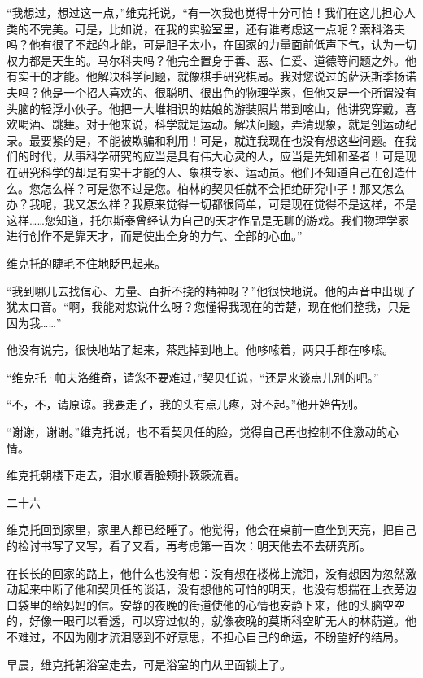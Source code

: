“我想过，想过这一点，”维克托说，“有一次我也觉得十分可怕！我们在这儿担心人类的不完美。可是，比如说，在我的实验室里，还有谁考虑这一点呢？索科洛夫吗？他有很了不起的才能，可是胆子太小，在国家的力量面前低声下气，认为一切权力都是天生的。马尔科夫吗？他完全置身于善、恶、仁爱、道德等问题之外。他有实干的才能。他解决科学问题，就像棋手研究棋局。我对您说过的萨沃斯季扬诺夫吗？他是一个招人喜欢的、很聪明、很出色的物理学家，但他又是一个所谓没有头脑的轻浮小伙子。他把一大堆相识的姑娘的游装照片带到喀山，他讲究穿戴，喜欢喝酒、跳舞。对于他来说，科学就是运动。解决问题，弄清现象，就是创运动纪录。最要紧的是，不能被欺骗和利用！可是，就连我现在也没有想这些问题。在我们的时代，从事科学研究的应当是具有伟大心灵的人，应当是先知和圣者！可是现在研究科学的却是有实干才能的人、象棋专家、运动员。他们不知道自己在创造什么。您怎么样？可是您不过是您。柏林的契贝任就不会拒绝研究中子！那又怎么办？我呢，我又怎么样？我原来觉得一切都很简单，可是现在觉得不是这样，不是这样……您知道，托尔斯泰曾经认为自己的天才作品是无聊的游戏。我们物理学家进行创作不是靠天才，而是使出全身的力气、全部的心血。”

维克托的睫毛不住地眨巴起来。

“我到哪儿去找信心、力量、百折不挠的精神呀？”他很快地说。他的声音中出现了犹太口音。“啊，我能对您说什么呀？您懂得我现在的苦楚，现在他们整我，只是因为我……”

他没有说完，很快地站了起来，茶匙掉到地上。他哆嗦着，两只手都在哆嗦。

“维克托·帕夫洛维奇，请您不要难过，”契贝任说，“还是来谈点儿别的吧。”

“不，不，请原谅。我要走了，我的头有点儿疼，对不起。”他开始告别。

“谢谢，谢谢。”维克托说，也不看契贝任的脸，觉得自己再也控制不住激动的心情。

维克托朝楼下走去，泪水顺着脸颊扑簌簌流着。

二十六

维克托回到家里，家里人都已经睡了。他觉得，他会在桌前一直坐到天亮，把自己的检讨书写了又写，看了又看，再考虑第一百次：明天他去不去研究所。

在长长的回家的路上，他什么也没有想：没有想在楼梯上流泪，没有想因为忽然激动起来中断了他和契贝任的谈话，没有想他的可怕的明天，也没有想揣在上衣旁边口袋里的给妈妈的信。安静的夜晚的街道使他的心情也安静下来，他的头脑空空的，好像一眼可以看透，可以穿过似的，就像夜晚的莫斯科空旷无人的林荫道。他不难过，不因为刚才流泪感到不好意思，不担心自己的命运，不盼望好的结局。

早晨，维克托朝浴室走去，可是浴室的门从里面锁上了。

